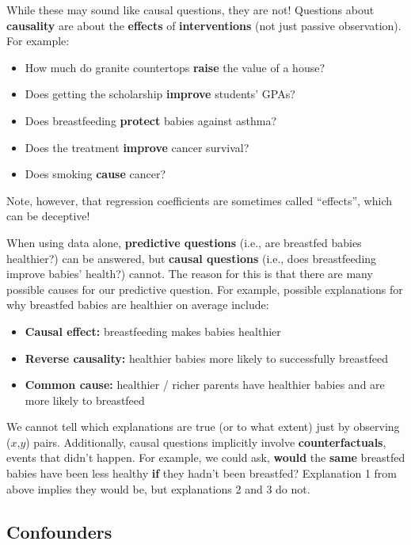 \documentclass[
  letterpaper,
  DIV=11,
  numbers=noendperiod]{scrreprt}
\providecommand{\tightlist}{%
  \setlength{\itemsep}{0pt}\setlength{\parskip}{0pt}}\usepackage{longtable,booktabs,array}
\begin{document}
While these may sound like causal questions, they are not! Questions
about \textbf{causality} are about the \textbf{effects} of
\textbf{interventions} (not just passive observation). For example:

\begin{itemize}
\tightlist
\item
  How much do granite countertops \textbf{raise} the value of a house?
\item
  Does getting the scholarship \textbf{improve} students' GPAs?
\item
  Does breastfeeding \textbf{protect} babies against asthma?
\item
  Does the treatment \textbf{improve} cancer survival?
\item
  Does smoking \textbf{cause} cancer?
\end{itemize}

Note, however, that regression coefficients are sometimes called
``effects'', which can be deceptive!

When using data alone, \textbf{predictive questions} (i.e., are
breastfed babies healthier?) can be answered, but \textbf{causal
questions} (i.e., does breastfeeding improve babies' health?) cannot.
The reason for this is that there are many possible causes for our
predictive question. For example, possible explanations for why
breastfed babies are healthier on average include:

\begin{itemize}
\tightlist
\item
  \textbf{Causal effect:} breastfeeding makes babies healthier
\item
  \textbf{Reverse causality:} healthier babies more likely to
  successfully breastfeed
\item
  \textbf{Common cause:} healthier / richer parents have healthier
  babies and are more likely to breastfeed
\end{itemize}

We cannot tell which explanations are true (or to what extent) just by
observing (\(x\),\(y\)) pairs. Additionally, causal questions implicitly
involve \textbf{counterfactuals}, events that didn't happen. For
example, we could ask, \textbf{would} the \textbf{same} breastfed babies
have been less healthy \textbf{if} they hadn't been breastfed?
Explanation 1 from above implies they would be, but explanations 2 and 3
do not.

\subsection{Confounders}\label{confounders}
\end{document}
